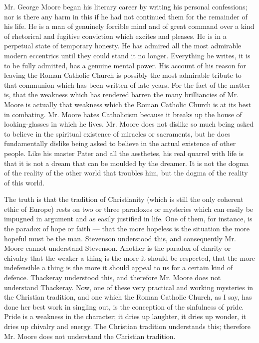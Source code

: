 Mr. George Moore began his literary career by writing his personal confessions; nor is there any harm in this if he had not continued them for the remainder of his life. He is a man of genuinely forcible mind and of great command over a kind of rhetorical and fugitive conviction which excites and pleases. He is in a perpetual state of temporary honesty. He has admired all the most admirable modern eccentrics until they could stand it no longer. Everything he writes, it is to be fully admitted, has a genuine mental power. His account of his reason for leaving the Roman Catholic Church is possibly the most admirable tribute to that communion which has been written of late years. For the fact of the matter is, that the weakness which has rendered barren the many brilliancies of Mr. Moore is actually that weakness which the Roman Catholic Church is at its best in combating. Mr. Moore hates Catholicism because it breaks up the house of looking-glasses in which he lives. Mr. Moore does not dislike so much being asked to believe in the spiritual existence of miracles or sacraments, but he does fundamentally dislike being asked to believe in the actual existence of other people. Like his master Pater and all the aesthetes, his real quarrel with life is that it is not a dream that can be moulded by the dreamer. It is not the dogma of the reality of the other world that troubles him, but the dogma of the reality of this world.

The truth is that the tradition of Christianity (which is still the only coherent ethic of Europe) rests on two or three paradoxes or mysteries which can easily be impugned in argument and as easily justified in life. One of them, for instance, is the paradox of hope or faith — that the more hopeless is the situation the more hopeful must be the man. Stevenson understood this, and consequently Mr. Moore cannot understand Stevenson. Another is the paradox of charity or chivalry that the weaker a thing is the more it should be respected, that the more indefensible a thing is the more it should appeal to us for a certain kind of defence. Thackeray understood this, and therefore Mr. Moore does not understand Thackeray. Now, one of these very practical and working mysteries in the Christian tradition, and one which the Roman Catholic Church, as I say, has done her best work in singling out, is the conception of the sinfulness of pride. Pride is a weakness in the character; it dries up laughter, it dries up wonder, it dries up chivalry and energy. The Christian tradition understands this; therefore Mr. Moore does not understand the Christian tradition.

